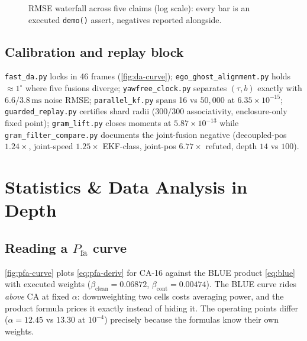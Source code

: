 \documentclass[11pt,oneside]{book}
\begin{document}
\begin{figure}[htbp]
\centering
{}
\caption{RMSE waterfall across five claims (log scale): every bar is an
executed \texttt{demo()} assert, negatives reported alongside.}
\label{fig:rmse-fall}
\end{figure}

\section{Calibration and replay block}
\label{sec:code-calib}

\texttt{fast\_da.py} locks in 46 frames (\cref{fig:da-curve});
\texttt{ego\_ghost\_alignment.py} holds $\approx1^\circ$ where five fusions
diverge; \texttt{yawfree\_clock.py} separates $(\tau,b)$ exactly with
$6.6/3.8\,\mathrm{ms}$ noise RMSE; \texttt{parallel\_kf.py} spans 16 vs
$50{,}000$ at $6.35\times10^{-15}$; \texttt{guarded\_replay.py} certifies
shard radii ($300/300$ associativity, enclosure-only fixed point);
\texttt{gram\_lift.py} closes moments at $5.87\times10^{-13}$ while
\texttt{gram\_filter\_compare.py} documents the joint-fusion negative
(decoupled-pos $1.24\times$, joint-speed $1.25\times$ EKF-class, joint-pos
$6.77\times$ refuted, depth $14$ vs $100$).

\chapter{Statistics \& Data Analysis in Depth}
\label{ch:stats}

\section{Reading a $P_{\mathrm{fa}}$ curve}
\label{sec:pfa-curve}

\cref{fig:pfa-curve} plots \cref{eq:pfa-deriv} for CA-16 against the BLUE
product \cref{eq:blue} with executed weights
($\beta_{\mathrm{clean}}=0.06872$, $\beta_{\mathrm{cont}}=0.00474$). The
BLUE curve rides \emph{above} CA at fixed $\alpha$: downweighting two cells
costs averaging power, and the product formula prices it exactly instead of
hiding it. The operating points differ ($\alpha=12.45$ vs $13.30$ at
$10^{-4}$) precisely because the formulas know their own weights.
\end{document}
